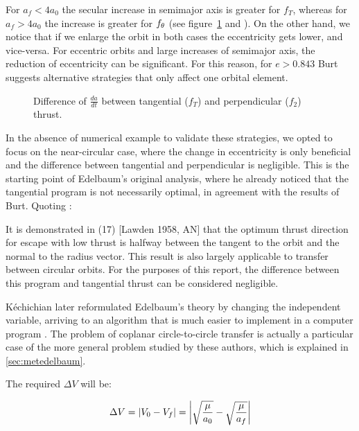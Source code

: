 For $a_f < 4 a_0$ the secular increase in semimajor axis is greater for $f_T$, whereas for $a_f > 4 a_0$ the increase is greater for $f_{\theta}$ (see figure~\ref{fig:burtdiff} and \cite{burt1967space}). On the other hand, we notice that if we enlarge the orbit in both cases the eccentricity gets lower, and vice-versa. For eccentric orbits and large increases of semimajor axis, the reduction of eccentricity can be significant. For this reason, for $e > 0.843$ Burt suggests alternative strategies that only affect one orbital element.

\begin{figure}%
  \centering
  \resizebox{0.8\textwidth}{!}
  {
  
  }
  \caption{Difference of $\frac{da}{dt}$ between tangential ($f_T$) and perpendicular ($f_2$) thrust.}
  \label{fig:burtdiff}
\end{figure}

In the absence of numerical example to validate these strategies, we opted to focus on the near-circular case, where the change in eccentricity is only beneficial and the difference between tangential and perpendicular is negligible. This is the starting point of Edelbaum's original analysis, where he already noticed that the tangential program is not necessarily optimal, in agreement with the results of Burt. Quoting \cite{edelbaum1961propulsion}:

\begin{displayquote}
It is demonstrated in (17) [Lawden 1958, AN] that the optimum thrust direction for escape with low thrust is halfway between the tangent to the orbit and the normal to the radius vector. This result is also largely applicable to transfer between circular orbits. For the purposes of this report, the difference between this program and tangential thrust can be considered negligible.
\end{displayquote}

Kéchichian later reformulated Edelbaum's theory by changing the independent variable, arriving to an algorithm that is much easier to implement in a computer program \cite{kechichian1997reformulation}. The problem of coplanar circle-to-circle transfer is actually a particular case of the more general problem studied by these authors, which is explained in \ref{sec:metedelbaum}.

The required $\Delta V$ will be:

\[
\Delta V = \left| V_0 - V_f \right| = \left| \sqrt{\frac{\mu}{a_0}} - \sqrt{\frac{\mu}{a_f}} \right|
\]

